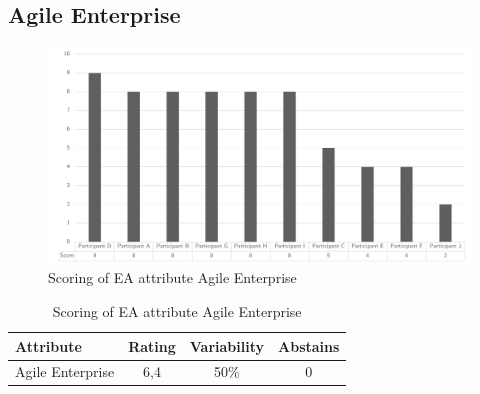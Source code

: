 \subsection{Agile Enterprise}
\begin{figure}[H]
	\centering
	\includegraphics[width=0.9\linewidth]{images/scoreeaagileenterprise}
	\caption[Scoring of EA attribute Agile Enterprise]{Scoring of EA attribute Agile Enterprise}
	\label{fig:appscoringeaagileneterprise}
\end{figure}
\begin{table}[H]
	\centering
	\begin{tabular}{p{}ccc}
		\toprule
		\textbf{Attribute} & \textbf{Rating} & \textbf{Variability} & \textbf{Abstains} \\
		\midrule
		Agile Enterprise & 6,4 & 50\% & 0 \\%
		\bottomrule
	\end{tabular}%
	\caption[Scoring of EA attribute Agile Enterprise]{Scoring of EA attribute Agile Enterprise}
	\label{tab:appscoringeaagileenterprise}%
\end{table}%
\newpage
